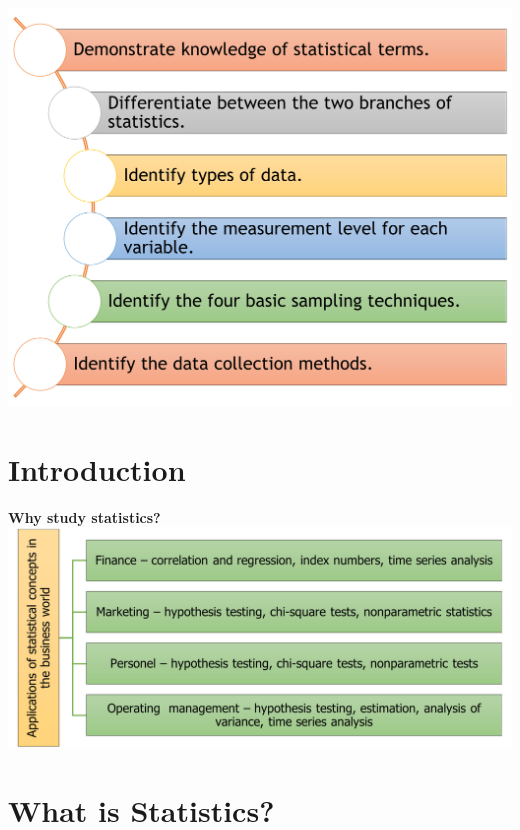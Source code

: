 \documentclass[
  a4paper,
  DIV=11,
  numbers=noendperiod,
  oneside]{scrreprt}
\begin{document}
\includegraphics[width=6.25in,height=\textheight]{images/ch1/Picture1.png}

\hypertarget{introduction}{%
\section{\texorpdfstring{Introduction\\
}{Introduction }}\label{introduction}}

\textbf{Why study statistics?}\\

\includegraphics[width=6.25in,height=\textheight]{images/ch1/Picture2.png}

\hypertarget{what-is-statistics}{%
\section{\texorpdfstring{What is Statistics?\\
}{What is Statistics? }}\label{what-is-statistics}}
\end{document}
